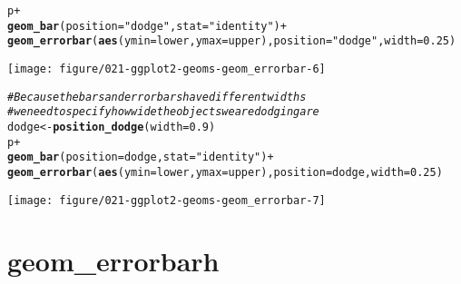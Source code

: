 \documentclass[a4paper,titlepage]{tufte-handout}\usepackage[]{graphicx}\usepackage[]{color}
\makeatletter
\def\maxwidth{ %
  \ifdim\Gin@nat@width>\linewidth
    \linewidth
  \else
    \Gin@nat@width
  \fi
}
\newcommand{\hlnum}[1]{\textcolor[rgb]{0.686,0.059,0.569}{#1}}%
\newcommand{\hlstr}[1]{\textcolor[rgb]{0.192,0.494,0.8}{#1}}%
\newcommand{\hlcom}[1]{\textcolor[rgb]{0.678,0.584,0.686}{\textit{#1}}}%
\newcommand{\hlopt}[1]{\textcolor[rgb]{0,0,0}{#1}}%
\newcommand{\hlstd}[1]{\textcolor[rgb]{0.345,0.345,0.345}{#1}}%
\newcommand{\hlkwb}[1]{\textcolor[rgb]{0.69,0.353,0.396}{#1}}%
\newcommand{\hlkwc}[1]{\textcolor[rgb]{0.333,0.667,0.333}{#1}}%
\newcommand{\hlkwd}[1]{\textcolor[rgb]{0.737,0.353,0.396}{\textbf{#1}}}%
\newenvironment{kframe}{%
 \def\at@end@of@kframe{}%
 \ifinner\ifhmode%
  \def\at@end@of@kframe{\end{minipage}}%
  \begin{minipage}{\columnwidth}%
 \fi\fi%
 \def\FrameCommand##1{\hskip\@totalleftmargin \hskip-\fboxsep
 \colorbox{shadecolor}{##1}\hskip-\fboxsep
     \hskip-\linewidth \hskip-\@totalleftmargin \hskip\columnwidth}%
 \MakeFramed {\advance\hsize-\width
   \@totalleftmargin\z@ \linewidth\hsize
   \@setminipage}}%
 {\par\unskip\endMakeFramed%
 \at@end@of@kframe}
\newenvironment{knitrout}{}{} %
\makeatother
\begin{document}
\begin{knitrout}
\begin{kframe}
\begin{alltt}
\hlstd{p} \hlopt{+}
 \hlkwd{geom_bar}\hlstd{(}\hlkwc{position} \hlstd{=} \hlstr{"dodge"}\hlstd{,} \hlkwc{stat} \hlstd{=} \hlstr{"identity"}\hlstd{)} \hlopt{+}
 \hlkwd{geom_errorbar}\hlstd{(}\hlkwd{aes}\hlstd{(}\hlkwc{ymin} \hlstd{= lower,} \hlkwc{ymax} \hlstd{= upper),} \hlkwc{position} \hlstd{=} \hlstr{"dodge"}\hlstd{,} \hlkwc{width} \hlstd{=} \hlnum{0.25}\hlstd{)}
\end{alltt}
\end{kframe}
\texttt{[image: figure/021-ggplot2-geoms-geom\_errorbar-6]} 
\begin{kframe}\begin{alltt}
\hlcom{# Because the bars and errorbars have different widths}
\hlcom{# we need to specify how wide the objects we are dodging are}
\hlstd{dodge} \hlkwb{<-} \hlkwd{position_dodge}\hlstd{(}\hlkwc{width}\hlstd{=}\hlnum{0.9}\hlstd{)}
\hlstd{p} \hlopt{+}
  \hlkwd{geom_bar}\hlstd{(}\hlkwc{position} \hlstd{= dodge,} \hlkwc{stat} \hlstd{=} \hlstr{"identity"}\hlstd{)} \hlopt{+}
  \hlkwd{geom_errorbar}\hlstd{(}\hlkwd{aes}\hlstd{(}\hlkwc{ymin} \hlstd{= lower,} \hlkwc{ymax} \hlstd{= upper),} \hlkwc{position} \hlstd{= dodge,} \hlkwc{width} \hlstd{=} \hlnum{0.25}\hlstd{)}
\end{alltt}
\end{kframe}
\texttt{[image: figure/021-ggplot2-geoms-geom\_errorbar-7]} 

\end{knitrout}


\section{geom\_errorbarh}
\end{document}
